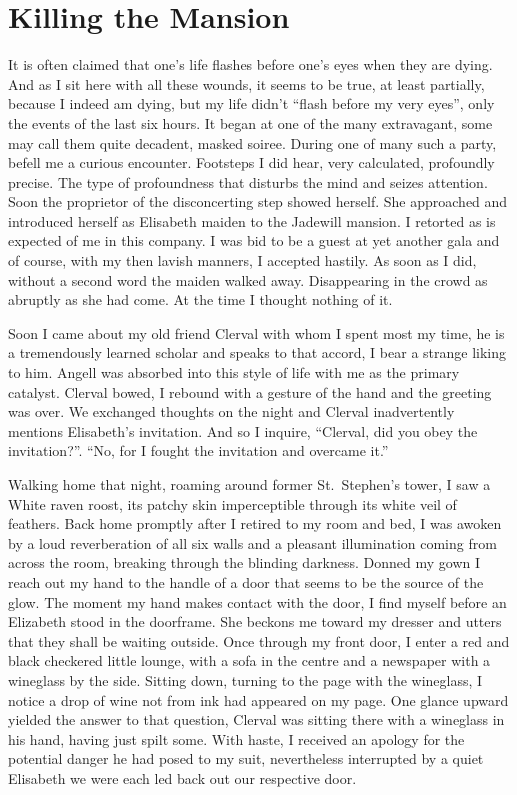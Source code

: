 \chapter{Killing the Mansion}

It is often claimed that one's life flashes before one's eyes when they
are dying. And as I sit here with all these wounds, it seems to be true,
at least partially, because I indeed am dying, but my life didn't
``flash before my very eyes'', only the events of the last six hours. It
began at one of the many extravagant, some may call them quite decadent,
masked soiree. During one of many such a party, befell me a curious
encounter. Footsteps I did hear, very calculated, profoundly precise.
The type of profoundness that disturbs the mind and seizes attention.
Soon the proprietor of the disconcerting step showed herself. She
approached and introduced herself as Elisabeth maiden to the Jadewill
mansion. I retorted as is expected of me in this company. I was bid to
be a guest at yet another gala and of course, with my then lavish
manners, I accepted hastily. As soon as I did, without a second word the
maiden walked away. Disappearing in the crowd as abruptly as she had
come. At the time I thought nothing of it.

Soon I came about my old friend Clerval with whom I spent most my time,
he is a tremendously learned scholar and speaks to that accord, I bear a
strange liking to him. Angell was absorbed into this style of life with
me as the primary catalyst. Clerval bowed, I rebound with a gesture of
the hand and the greeting was over. We exchanged thoughts on the night
and Clerval inadvertently mentions Elisabeth's invitation. And so I
inquire, ``Clerval, did you obey the invitation?''. ``No, for I fought
the invitation and overcame it.''

Walking home that night, roaming around former St.~Stephen's tower, I
saw a White raven roost, its patchy skin imperceptible through its white
veil of feathers. Back home promptly after I retired to my room and bed,
I was awoken by a loud reverberation of all six walls and a pleasant
illumination coming from across the room, breaking through the blinding
darkness. Donned my gown I reach out my hand to the handle of a door
that seems to be the source of the glow. The moment my hand makes
contact with the door, I find myself before an Elizabeth stood in the
doorframe. She beckons me toward my dresser and utters that they shall
be waiting outside. Once through my front door, I enter a red and black
checkered little lounge, with a sofa in the centre and a newspaper with
a wineglass by the side. Sitting down, turning to the page with the
wineglass, I notice a drop of wine not from ink had appeared on my page.
One glance upward yielded the answer to that question, Clerval was
sitting there with a wineglass in his hand, having just spilt some. With
haste, I received an apology for the potential danger he had posed to my
suit, nevertheless interrupted by a quiet Elisabeth we were each led
back out our respective door.

